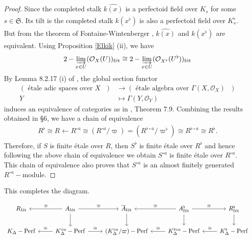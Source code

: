 \documentclass[12pts,a4paper]{amsart}
\DeclareMathOperator{\Perf}{Perf}
\DeclareMathOperator{\fet}{f\acute{e}t}
\begin{document}
    \begin{proof}
        Since the completed stalk $\widehat{k(x)}$ is a perfectoid field over $K_s$ for some $s\in\mathfrak{S}$. Its tilt is the completed stalk $\widehat{k(x^\flat)}$ is also a perfectoid field over $K^\flat_s$. But from the theorem of Fontaine-Wintenberger \cite{FonWin}, $\widehat{k(x)}_{\fet}$ and $\widehat{k(x^\flat)}_{\fet}$ are equivalent. Using Proposition \ref{Elkik} (ii), we have
        \begin{align*}
            2-\varinjlim\limits_{x\in U}(\mathcal{O}_X(U))_{\fet}\cong 2-\varinjlim\limits_{x\in U}(\mathcal{O}_{X^\flat}(U^\flat))_{\fet}
        \end{align*}
        By Lemma 8.2.17 (i) of \cite{KL}, the global section functor 
        \begin{align*}
            (\text{ \'etale adic spaces over $X$ } )&\to (\text{ \'etale algebra over $\Gamma(X,\mathcal{O}_X)$ })\\
              Y &\mapsto \Gamma(Y,\mathcal{O}_Y)
        \end{align*}
    induces an equivalence of categories as in \cite{Sch}, Theorem 7.9. Combining the results obtained in \S 6, we have a chain of equivalence
    \begin{align*}
        R^\flat_{\fet}\cong R_{\fet}\leftarrow R^{\circ a}_{\fet}\cong (R^{\circ a}/\varpi)_{\fet}=(R^{\flat\circ a}/\varpi^\flat)_{\fet}\cong R^{\flat\circ a}_{\fet}\cong R^\flat_{\fet}.
    \end{align*}
    Therefore, if $S$ is finite \'etale over $R$, then $S^\flat$ is finite \'etale over $R^\flat$ and hence following the above chain of equivalence we obtain $S^{\circ a}$ is finite \'etale over $R^{\circ a}$. This chain of equivalence also proves that $S^{\circ a}$ is an almost finitely generated $R^{\circ a}-$module.
    \end{proof}

    This completes the diagram. 

    \[
    \begin{tikzcd}
    R_{\fet} &\arrow[l,swap,"\cong"] A_{\fet}\arrow[d]\arrow[r,"\cong"] & \overline{A}_{\fet}\arrow[d] & \arrow[l,swap,"\cong"] A^\flat_{\fet}\arrow[d] \arrow[r,"\cong"] & R^\flat_{\fet}\arrow[d]\\
   K_\Delta-\Perf  &\arrow[l,swap,"\cong"]K^{\circ a}_\Delta-\Perf\arrow[r,"\cong"] & (K^{\circ a}_\Delta/\varpi)-\Perf &\arrow[l,swap,"\cong"] K^{\flat\circ a}_\Delta-\Perf &\arrow[l,swap,"\cong"] K^\flat_\Delta-\Perf 
   \end{tikzcd} 
   \]
\end{document}
